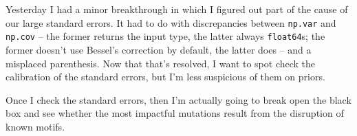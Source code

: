 \begin{Minutes}{}
\maketitle
{}
Yesterday I had a minor breakthrough in which I figured out part of the cause of our large standard errors. It had to do with discrepancies between \verb!np.var! and \verb!np.cov! -- the former returns the input type, the latter always \verb!float64!s; the former doesn't use Bessel's correction by default, the latter does -- and a misplaced parenthesis. Now that that's resolved, I want to spot check the calibration of the standard errors, but I'm less suspicious of them on priors.

Once I check the standard errors, then I'm actually going to break open the black box and see whether the most impactful mutations result from the disruption of known motifs.

\end{Minutes}
